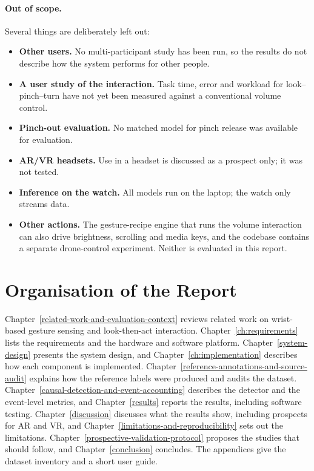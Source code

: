 \paragraph{Out of scope.} Several things are deliberately left out:
\begin{itemize}
\item \textbf{Other users.} No multi-participant study has been run, so the results do not describe how the system performs for other people.
\item \textbf{A user study of the interaction.} Task time, error and workload for look--pinch--turn have not yet been measured against a conventional volume control.
\item \textbf{Pinch-out evaluation.} No matched model for pinch release was available for evaluation.
\item \textbf{AR/VR headsets.} Use in a headset is discussed as a prospect only; it was not tested.
\item \textbf{Inference on the watch.} All models run on the laptop; the watch only streams data.
\item \textbf{Other actions.} The gesture-recipe engine that runs the volume interaction can also drive brightness, scrolling and media keys, and the codebase contains a separate drone-control experiment. Neither is evaluated in this report.
\end{itemize}

\section{Organisation of the Report}

Chapter~\ref{related-work-and-evaluation-context} reviews related work on wrist-based gesture sensing and look-then-act interaction. Chapter~\ref{ch:requirements} lists the requirements and the hardware and software platform. Chapter~\ref{system-design} presents the system design, and Chapter~\ref{ch:implementation} describes how each component is implemented. Chapter~\ref{reference-annotations-and-source-audit} explains how the reference labels were produced and audits the dataset. Chapter~\ref{causal-detection-and-event-accounting} describes the detector and the event-level metrics, and Chapter~\ref{results} reports the results, including software testing. Chapter~\ref{discussion} discusses what the results show, including prospects for AR and VR, and Chapter~\ref{limitations-and-reproducibility} sets out the limitations. Chapter~\ref{prospective-validation-protocol} proposes the studies that should follow, and Chapter~\ref{conclusion} concludes. The appendices give the dataset inventory and a short user guide.

